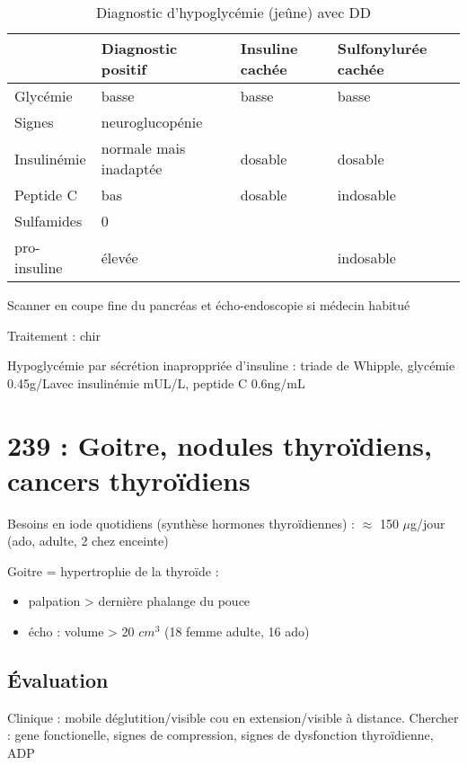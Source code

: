 \documentclass[11pt]{article}
\begin{document}
\begin{table}[htbp]
\caption{\label{tab:org57121cb}
Diagnostic d'hypoglycémie (jeûne) avec DD}
\centering
\begin{tabular}{llll}
\toprule
 & Diagnostic positif & Insuline cachée & Sulfonylurée cachée\\
\midrule
Glycémie & basse & basse & basse\\
Signes & neuroglucopénie &  & \\
Insulinémie & normale mais inadaptée & dosable & dosable\\
Peptide C & bas & dosable & indosable\\
Sulfamides & 0 &  & \\
pro-insuline & élevée &  & indosable\\
\bottomrule
\end{tabular}
\end{table}

Scanner en coupe fine du pancréas et écho-endoscopie si médecin habitué

Traitement : chir

\begin{tcolorbox}
Hypoglycémie par sécrétion inaproppriée d'insuline : triade de Whipple, glycémie \le 0.45g/L\footnotemark avec
insulinémie  mUL/L, peptide C \ge 0.6ng/mL
\end{tcolorbox}

\section{239 : Goitre, nodules thyroïdiens, cancers thyroïdiens}
\label{sec:org81d5fce}
Besoins en iode quotidiens (synthèse hormones thyroïdiennes) :  \(\approx\) 150 \(\mu\)g/jour (ado,
  adulte, \texttimes{} 2 chez enceinte)

Goitre = hypertrophie de la thyroïde :
\begin{itemize}
\item palpation > dernière phalange du pouce
\item écho : volume > 20 \(cm^3\) (18 femme adulte, 16 ado)
\end{itemize}

\subsection{Évaluation}
\label{sec:org6149b2b}
Clinique : mobile déglutition/visible cou en extension/visible à
distance. Chercher : gene fonctionelle, signes de compression, signes de
dysfonction thyroïdienne, \acrshort{ADP}
\end{document}
